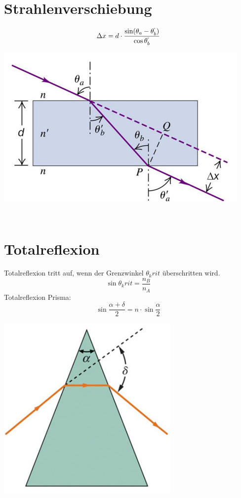 \section{Strahlenverschiebung}
\[
	\Delta x = d \cdot \frac{ \sin (\theta_a -\theta_b ^`)}{\cos \theta_b ^`}
\]
\begin{center}
	\includegraphics[scale = 0.3]{images/strahlenverschiebung.jpg}
\end{center}
\

\section{Totalreflexion}
Totalreflexion tritt auf, wenn der Grenzwinkel $\theta_krit$ überschritten wird.
\[
	\sin \theta_krit = \frac{n_B}{n_A}
\]
Totalreflexion Prisma:
\[
	\sin\frac{\alpha+\delta}{2} = n\cdot \sin \frac{\alpha}{2}
\]
\begin{center}
	\includegraphics[scale = 0.2]{images/tr_prisma.jpg}
\end{center}
\
